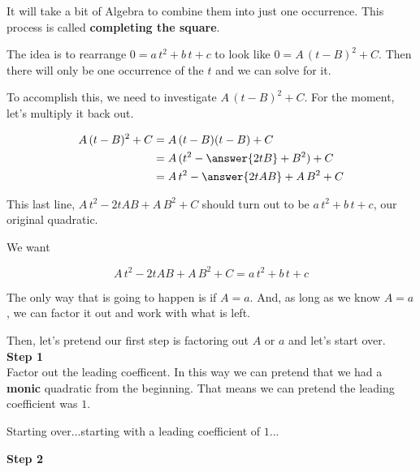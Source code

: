 \documentclass{ximera}
\begin{document}
It will take a bit of Algebra to combine them into just one occurrence. This process is called \textbf{completing the square}. \\



\begin{idea}


The idea is to rearrange  $0 = a \, t^2 + b \, t + c$ to look like $0 = A \, (t-B)^2 + C$.  Then there will only be  one occurrence of the $t$ and we can solve for it.


To accomplish this, we need to investigate $A \, (t-B)^2 + C$. For the moment, let's multiply it back out.


\begin{align*}
A \, (t-B)^2 + C & = A \, (t-B)(t-B) + C \\
& = A \, (t^2 - \answer{2 t B} + B^2) + C  \\
& = A \, t^2 - \answer{2 t A B} + A \, B^2 + C
\end{align*}

This last line, $A \, t^2 - 2 t A B + A \, B^2 + C$ should turn out to be $a \, t^2 + b \, t + c$, our original quadratic.

\end{idea}






We want


\[ A \, t^2 - 2 t A B + A \, B^2 + C = a \, t^2 + b \, t + c \]



The only way that is going to happen is if $A = a$. And, as long as we know $A = a$, we can factor it out and work with what is left.

Then, let's pretend our first step is factoring out $A$ or $a$ and let's start over. \\






\textbf{\textcolor{blue!75!black}{Step 1}} \\

 Factor out the leading coefficent.   In this way we can pretend that we had a \textbf{monic} quadratic from the beginning.  That means we can pretend the leading coefficient was $1$.


Starting over...starting with a leading coefficient of $1$...


\textbf{\textcolor{blue!75!black}{Step 2}} \\
\end{document}
